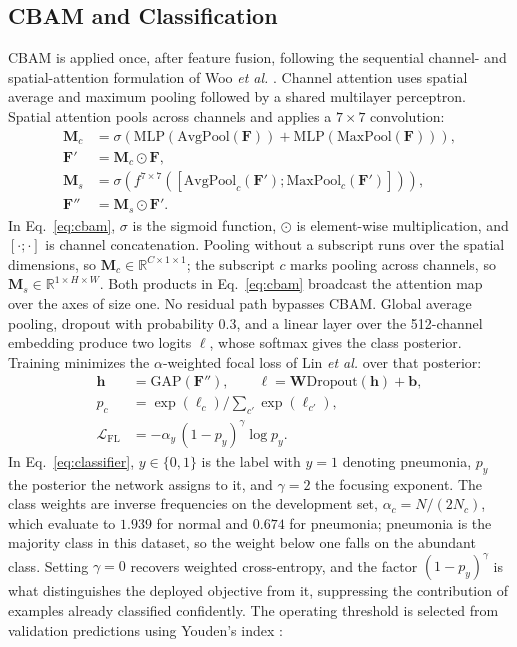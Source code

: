 \documentclass[conference]{IEEEtran}
\begin{document}
\subsection{CBAM and Classification}
CBAM is applied once, after feature fusion, following the sequential channel- and spatial-attention formulation of Woo \emph{et al.} \cite{woo2018cbam}. Channel attention uses spatial average and maximum pooling followed by a shared multilayer perceptron. Spatial attention pools across channels and applies a $7\times7$ convolution:
\begin{align}
\mathbf{M}_c &= \sigma\!\left(\mathrm{MLP}(\mathrm{AvgPool}(\mathbf{F}))+
\mathrm{MLP}(\mathrm{MaxPool}(\mathbf{F}))\right), \nonumber\\
\mathbf{F}' &= \mathbf{M}_c\odot\mathbf{F}, \nonumber\\
\mathbf{M}_s &= \sigma\!\left(f^{7\times7}([\mathrm{AvgPool}_c(\mathbf{F}');
\mathrm{MaxPool}_c(\mathbf{F}')])\right), \nonumber\\
\mathbf{F}'' &= \mathbf{M}_s\odot\mathbf{F}'.
\label{eq:cbam}
\end{align}
In Eq.~\ref{eq:cbam}, $\sigma$ is the sigmoid function, $\odot$ is element-wise multiplication, and $[\cdot;\cdot]$ is channel concatenation. Pooling without a subscript runs over the spatial dimensions, so $\mathbf{M}_c\in\mathbb{R}^{C\times1\times1}$; the subscript $c$ marks pooling across channels, so $\mathbf{M}_s\in\mathbb{R}^{1\times H\times W}$. Both products in Eq.~\ref{eq:cbam} broadcast the attention map over the axes of size one. No residual path bypasses CBAM. Global average pooling, dropout with probability $0.3$, and a linear layer over the 512-channel embedding produce two logits $\boldsymbol{\ell}$, whose softmax gives the class posterior. Training minimizes the $\alpha$-weighted focal loss of Lin \emph{et al.} \cite{lin2017focal} over that posterior:
\begin{align}
\mathbf{h}&=\mathrm{GAP}(\mathbf{F}''),\qquad
\boldsymbol{\ell}=\mathbf{W}\mathrm{Dropout}(\mathbf{h})+\mathbf{b}, \nonumber\\
p_c&=\exp(\ell_c)\big/\textstyle\sum_{c'}\exp(\ell_{c'}), \nonumber\\
\mathcal{L}_{\mathrm{FL}}&=-\alpha_y\,(1-p_y)^{\gamma}\log p_y .
\label{eq:classifier}
\end{align}
In Eq.~\ref{eq:classifier}, $y\in\{0,1\}$ is the label with $y=1$ denoting pneumonia, $p_y$ the posterior the network assigns to it, and $\gamma=2$ the focusing exponent. The class weights are inverse frequencies on the development set, $\alpha_c=N/(2N_c)$, which evaluate to $1.939$ for normal and $0.674$ for pneumonia; pneumonia is the majority class in this dataset, so the weight below one falls on the abundant class. Setting $\gamma=0$ recovers weighted cross-entropy, and the factor $(1-p_y)^{\gamma}$ is what distinguishes the deployed objective from it, suppressing the contribution of examples already classified confidently. The operating threshold is selected from validation predictions using Youden's index \cite{youden1950index}:
\end{document}
